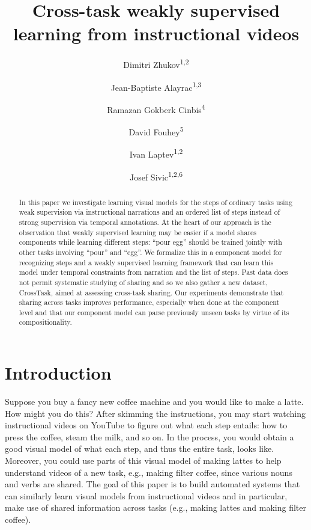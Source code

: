 \documentclass[10pt,twocolumn,letterpaper]{article}
\begin{document}
\title{\textbf{Cross-task weakly supervised learning from instructional videos}}
\author{Dimitri Zhukov\textsuperscript{1,2}
\and Jean-Baptiste Alayrac\textsuperscript{1,3}
\and Ramazan Gokberk Cinbis\textsuperscript{4}
\and David Fouhey\textsuperscript{5}
\and Ivan Laptev\textsuperscript{1,2}
\and Josef Sivic\textsuperscript{1,2,6}
}

\date{\vspace{-5ex}}

\maketitle


\begin{abstract}
In this paper we investigate learning visual models for the steps of ordinary tasks using weak supervision via instructional narrations and an ordered list of steps instead of strong supervision via temporal annotations. At the heart of our approach is the observation that weakly supervised learning may be easier if a model shares components while learning different steps: ``pour egg'' should be trained jointly with other tasks involving ``pour'' and ``egg''.  We formalize this in a component model for recognizing steps and a weakly supervised learning framework that can learn this model under temporal constraints from narration and the list of steps. Past data does not permit systematic studying of sharing and so we also gather a new dataset, CrossTask, aimed at assessing cross-task sharing. Our experiments demonstrate that sharing across tasks improves performance, especially when done at the component level and that our component model can parse previously unseen tasks by virtue of its compositionality.
\end{abstract}

\section{Introduction}
\label{sec:introduction}
Suppose you buy a fancy new coffee machine and you would like to make a latte.
How might you do this? After skimming the instructions, you may start
watching instructional videos on YouTube to figure out what each step entails:
how to press the coffee, steam the milk, and so on. In the process, you would
obtain a good visual model of what each step, and thus the entire task, looks like.
Moreover, you could use parts of this visual model of making lattes to help
understand videos of a new task, e.g., making filter coffee, since various nouns and verbs
are shared. The goal of this paper is to build automated systems that can similarly
learn visual models from instructional videos and in particular, make use of shared
information across tasks (e.g., making lattes and making filter coffee).
\end{document}
